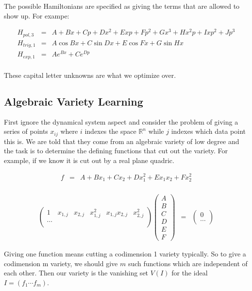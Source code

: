 \documentclass[a4paper,landscape]{article}
\theoremstyle{change}
\theoremstyle{nonumberplain}
\numberwithin{equation}{section}
\begin{document}
The possible Hamiltonians are specified as giving the terms that are allowed to show up. For exampe:

\begin{eqnarray*}
H_{pol,3} &=& A + Bx + Cp + Dx^2 + E xp + Fp^2 + G x^3 + H x^2 p + I xp^2 + J p^3\\
H_{trig,1} &=& A \cos B x + C \sin D x + E \cos F x + G \sin H x\\
H_{exp,1} &=& A e^{Bx} + C e^{Dp}\\
\end{eqnarray*}

These capital letter unknowns are what we optimize over.

\subsection{Algebraic Variety Learning}

First ignore the dynamical system aspect and consider the problem of giving a series of points $x_{ij}$ where $i$ indexes the space $\mathbb{R}^n$ while $j$ indexes which data point this is. We are told that they come from an algebraic variety of low degree and the task is to determine the defining functions that cut out the variety. For example, if we know it is cut out by a real plane quadric.

\begin{eqnarray*}
f &=& A + B x_1 + C x_2 + D x_1^2 + E x_1 x_2 + F x_2^2\\
\end{eqnarray*}

\begin{eqnarray*}
\begin{pmatrix}
1 & x_{1,j} & x_{2,j} & x_{1,j}^2 & x_{1,j} x_{2,j} & x_{2,j}^2\\
\cdots\\
\end{pmatrix}
\begin{pmatrix}
A\\
B\\
C\\
D\\
E\\
F
\end{pmatrix}
&=&
\begin{pmatrix}
0\\
\cdots
\end{pmatrix}
\end{eqnarray*}

Giving one function means cutting a codimension 1 variety typically. So to give a codimension m variety, we should give $m$ such functions which are independent of each other. Then our variety is the vanishing set $V(I)$ for the ideal $I = (f_1 \cdots f_m)$.
\end{document}
